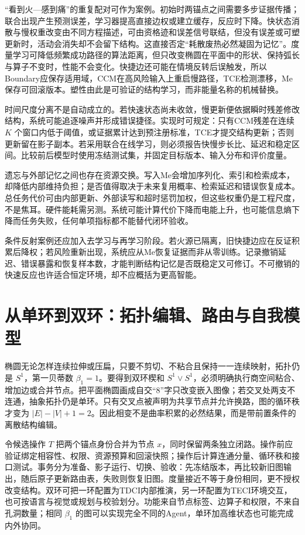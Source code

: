 “看到火—感到痛”的重复配对可作为案例。初始时两锚点之间需要多步证据传播；联合出现产生预测误差，学习器提高直接边权或建立缓存，反应时下降。快状态消散与慢权重改变由不同方程描述，可由资格迹和误差信号联结，但没有误差或可塑更新时，活动会消失却不会留下结构。这直接否定“耗散废热必然凝固为记忆”。度量学习可降低频繁成功路径的算法距离，但只改变椭圆在平面中的形状、保持弧长与算子不变时，性能不会变化。快捷边还可能在情境反转后误触发，所以Boundary应保存适用域，CCM在高风险输入上重启慢路径，TCE检测漂移，Me保存可回滚版本。塑性由此是可验证的结构学习，而非能量名称的机械替换。

时间尺度分离不是自动成立的。若快速状态尚未收敛，慢更新便依据瞬时残差修改结构，系统可能追逐噪声并形成错误捷径。实现时可规定：只有CCM残差在连续 $K$ 个窗口内低于阈值，或证据累计达到预注册标准，TCE才提交结构更新；否则更新留在影子副本。若采用联合在线学习，则必须报告快慢步长比、延迟和稳定区间。比较前后模型时使用冻结测试集，并固定目标版本、输入分布和评价度量。

遗忘与外部记忆之间也存在资源交换。写入Me会增加序列化、索引和检索成本，却降低内部维持负担；是否值得取决于未来复用概率、检索延迟和错误恢复成本。总任务代价可由内部更新、外部读写和超时惩罚加权，但这些权重仍是工程尺度，不是焦耳。硬件能耗需另测。系统可能计算代价下降而电能上升，也可能信息熵下降而任务失败，任何单项指标都不能替代闭环验收。

条件反射案例还应加入去学习与再学习阶段。若火源已隔离，旧快捷边应在反证积累后降权；若风险重新出现，系统应从Me恢复证据而非从零训练。记录撤销延迟、错误暴露和恢复样本数，才能判断结构记忆是否既稳定又可修订。不可撤销的快速反应也许适合恒定环境，却不应概括为更高智能。

\section{从单环到双环：拓扑编辑、路由与自我模型}
\label{sec:topological_phase_transition_lemniscate}
\label{sec:quantum_dynamics_and_self_nucleation}

椭圆无论怎样连续拉伸或压扁，只要不剪切、不粘合且保持一一连续映射，拓扑仍是 $S^1$，第一贝蒂数 $\beta_1=1$。要得到双环楔和 $S^1\vee S^1$，必须明确执行商空间粘合、增加边或合并节点。把平面椭圆画成自交“8”字只改变嵌入图像；若交叉处两支不连通，抽象拓扑仍是单环。只有交叉点被声明为共享节点并允许换路，图的循环秩才变为 $|E|-|V|+1=2$。因此相变不是曲率积累的必然结果，而是带前置条件的离散结构编辑。

令候选操作 $T$ 把两个锚点身份合并为节点 $x$，同时保留两条独立闭路。操作前应验证绑定相容性、权限、资源预算和回滚快照；操作后计算连通分量、循环秩和接口测试。事务分为准备、影子运行、切换、验收：先冻结版本，再比较新旧图输出，随后原子更新路由表，失败则恢复旧图。度量接近不等于身份相同，更不授权改变结构。双环可把一环配置为TDCI内部推演，另一环配置为TECI环境交互，也可按语言与视觉或规划与校验划分。功能来自节点标签、边算子和权限，不来自孔洞数量；相同 $\beta_1$ 的图可以实现完全不同的Agent，单环加高维状态也可能完成内外协同。

